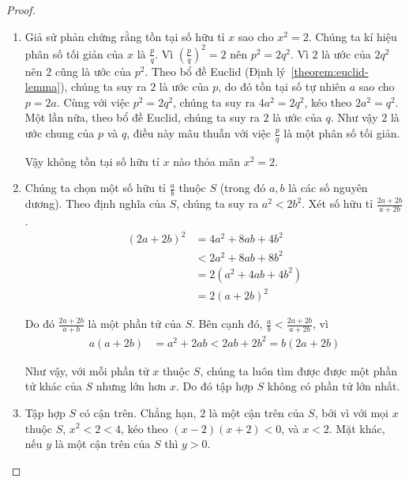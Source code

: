\begin{proof}
    \begin{enumerate}[label={(\roman*)}]
        \item Giả sử phản chứng rằng tồn tại số hữu tỉ $x$ sao cho $x^{2} = 2$. Chúng ta kí hiệu phân số tối giản của $x$ là $\frac{p}{q}$. Vì ${\left(\frac{p}{q}\right)}^{2} = 2$ nên $p^{2} = 2q^{2}$. Vì $2$ là ước của $2q^{2}$ nên $2$ cũng là ước của $p^{2}$. Theo bổ đề Euclid (Định lý~\ref{theorem:euclid-lemma}), chúng ta suy ra $2$ là ước của $p$, do đó tồn tại số tự nhiên $a$ sao cho $p = 2a$. Cùng với việc $p^{2} = 2q^{2}$, chúng ta suy ra $4a^{2} = 2q^{2}$, kéo theo $2a^{2} = q^{2}$. Một lần nữa, theo bổ đề Euclid, chúng ta suy ra $2$ là ước của $q$. Như vậy $2$ là ước chung của $p$ và $q$, điều này mâu thuẫn với việc $\frac{p}{q}$ là một phân số tối giản.

              Vậy không tồn tại số hữu tỉ $x$ nào thỏa mãn $x^{2} = 2$.
        \item Chúng ta chọn một số hữu tỉ $\frac{a}{b}$ thuộc $S$ (trong đó $a, b$ là các số nguyên dương). Theo định nghĩa của $S$, chúng ta suy ra $a^{2} < 2b^{2}$. Xét số hữu tỉ $\frac{2a + 2b}{a + 2b}$.
              \begin{align*}
                  {(2a + 2b)}^{2} & = 4a^{2} + 8ab + 4b^{2}   \\
                                  & < 2a^{2} + 8ab + 8b^{2}   \\
                                  & = 2(a^{2} + 4ab + 4b^{2}) \\
                                  & = 2{(a + 2b)}^{2}
              \end{align*}

              Do đó $\frac{2a + 2b}{a + b}$ là một phần tử của $S$. Bên cạnh đó, $\frac{a}{b} < \frac{2a + 2b}{a + 2b}$, vì
              \begin{align*}
                  a(a + 2b) & = a^{2} + 2ab < 2ab + 2b^{2} = b(2a + 2b)
              \end{align*}

              Như vậy, với mỗi phần tử $x$ thuộc $S$, chúng ta luôn tìm được được một phần tử khác của $S$ nhưng lớn hơn $x$. Do đó tập hợp $S$ không có phần tử lớn nhất.
        \item Tập hợp $S$ có cận trên. Chẳng hạn, $2$ là một cận trên của $S$, bởi vì với mọi $x$ thuộc $S$, $x^{2} < 2 < 4$, kéo theo $(x - 2)(x + 2) < 0$, và $x < 2$. Mặt khác, nếu $y$ là một cận trên của $S$ thì $y > 0$.


\end{enumerate}
\end{proof}
